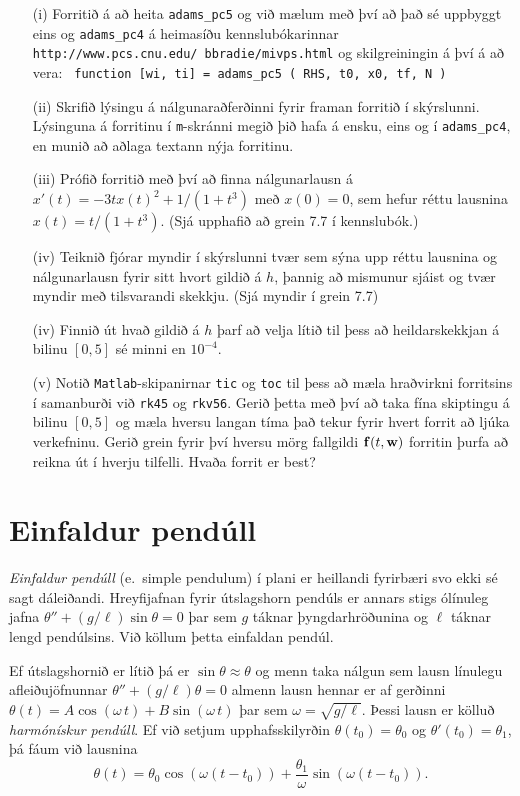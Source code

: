 \documentclass[11pt,icelandic]{article}
\newcommand{\wv}{\mbox{${\bf w}$}}
\newcommand{\fv}{\mbox{${\bf f}$}}
\begin{document}
\begin{enumerate}
\item [(i)]  Forritið á að heita {\tt adams{\_}pc5} og við mælum með því að 
það sé uppbyggt eins og  {\tt adams{\_}pc4} á heimasíðu
kennslubókarinnar {\tt http://www.pcs.cnu.edu/~bbradie/mivps.html} og
skilgreiningin á því á að vera:
{\tt 
function [wi, ti] = adams{\_}pc5 ( RHS, t0, x0, tf, N )
}

\item [(ii)]  Skrifið lýsingu á nálgunaraðferðinni fyrir framan
forritið í skýrslunni.  Lýsinguna 
á forritinu í {\tt m}-skránni megið þið hafa á ensku, eins
og í {\tt adams{\_}pc4}, en munið að aðlaga textann nýja forritinu.
\item [(iii)] Prófið forritið með því að finna nálgunarlausn á
$x'(t)=-3tx(t)^2+1/(1+t^3)$ með  $x(0)=0$, sem hefur réttu lausnina
$x(t)=t/(1+t^3)$.  (Sjá upphafið að grein 7.7 í kennslubók.) 
\item [(iv)] Teiknið fjórar myndir í skýrslunni tvær sem 
sýna upp réttu lausnina og nálgunarlausn fyrir sitt hvort gildið
á $h$, þannig að mismunur sjáist og tvær myndir með tilsvarandi
skekkju.  (Sjá myndir í grein 7.7) 
\item[(iv)] Finnið út hvað gildið á $h$ þarf að velja lítið 
til þess að  heildarskekkjan á bilinu $[0,5]$ sé minni en $10^{-4}$.
\item[(v)] Notið {\tt Matlab}-skipanirnar {\tt tic} og {\tt toc}
til þess að mæla hraðvirkni forritsins í samanburði við 
{\tt rk45} og {\tt rkv56}.  Gerið þetta með því að taka fína skiptingu
á bilinu $[0,5]$ og mæla hversu langan tíma það tekur fyrir hvert
forrit að ljúka verkefninu.  Gerið grein fyrir því hversu mörg
fallgildi $\fv(t,\wv)$ forritin þurfa að reikna út í hverju tilfelli.
Hvaða forrit er best?  
\end{enumerate}


\section{Einfaldur pendúll}


{\it Einfaldur pendúll} (e.~simple pendulum) í plani 
er heillandi fyrirbæri svo ekki sé sagt dáleiðandi. 
Hreyfijafnan fyrir útslagshorn pendúls er 
annars stigs ólínuleg jafna $\theta''+(g/\ell)\sin \theta=0$
þar sem  $g$ táknar þyngdarhröðunina og $\ell$ táknar
lengd pendúlsins.    Við köllum þetta einfaldan pendúl.

\smallskip
Ef útslagshornið er lítið þá er $\sin \theta\approx \theta$ 
og menn taka nálgun sem lausn línulegu afleiðujöfnunnar 
$\theta''+(g/\ell)\theta=0$ almenn lausn hennar er
af gerðinni $\theta(t)=A\cos(\omega\, t) + B\sin(\omega\, t)$
þar sem $\omega=\sqrt{g/\ell}$.  Þessi lausn er kölluð {\it harmónískur
  pendúll}.  Ef við setjum upphafsskilyrðin
$\theta(t_0)=\theta_0$ og 
$\theta'(t_0)=\theta_1$, þá fáum við lausnina
$$
\theta(t)=\theta_0\cos(\omega(t-t_0)) + \dfrac{\theta_1}\omega 
\sin(\omega(t-t_0)).
$$
\end{document}
